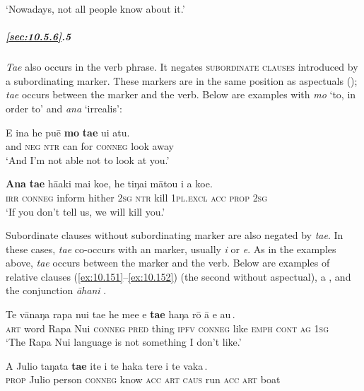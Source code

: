 \glt 
‘Nowadays, not all people know about it.’ \textstyleExampleref{[R647.206]} 
\z

\subparagraph{\ref{sec:10.5.6}.5} \textit{Ta{\ꞌ}e} also occurs in the verb phrase. It negates \textsc{subordinate clauses} introduced by a subordinating marker. These markers are in the same position as aspectuals (); \textit{\mbox{ta{\ꞌ}e}} occurs between the marker and the verb. Below are examples with \textit{mo} ‘to, in order to’ and \textit{ana} ‘irrealis’:

\ea\label{ex:10.149}
\gll {\ꞌ}E {\ꞌ}ina he puē \textbf{mo} \textbf{ta{\ꞌ}e} u{\ꞌ}i atu. \\
and \textsc{neg} \textsc{ntr} can for \textsc{conneg} look away \\

\glt 
‘And I’m not able not to look at you.’ \textstyleExampleref{[R308.023]} 
\z

\ea\label{ex:10.150}
\gll \textbf{Ana} \textbf{ta{\ꞌ}e} hā{\ꞌ}aki mai koe, he tiŋa{\ꞌ}i mātou i a koe. \\
\textsc{irr} \textsc{conneg} inform hither \textsc{2sg} \textsc{ntr} kill \textsc{1pl.excl} \textsc{acc} \textsc{prop} \textsc{2sg} \\

\glt 
‘If you don’t tell us, we will kill you.’ \textstyleExampleref{[Mtx-7-21.030]}
\z

Subordinate clauses without subordinating marker are also negated by \textit{ta{\ꞌ}e}. In these cases, \textit{ta{\ꞌ}e} co-occurs with an  marker, usually \textit{i} or \textit{e}. As in the examples above, \textit{ta{\ꞌ}e} occurs between the marker and the verb. Below are examples of relative clauses (\ref{ex:10.151}–\ref{ex:10.152}) (the second without aspectual), a  , and the conjunction \textit{{\ꞌ}āhani} .

\ea\label{ex:10.151}
\gll Te vānaŋa rapa nui ta{\ꞌ}e he me{\ꞌ}e {\ob}e \textbf{ta{\ꞌ}e} haŋa rō {\ꞌ}ā e au\,{\cb}. \\
\textsc{art} word Rapa Nui \textsc{conneg} \textsc{pred} thing {\db}\textsc{ipfv} \textsc{conneg} like \textsc{emph} \textsc{cont} \textsc{ag} \textsc{1sg} \\

\glt 
‘The Rapa Nui language is not something I don’t like.’ \textstyleExampleref{[R648.251]} 
\z

\ea\label{ex:10.152}
\gll A Julio taŋata {\ob}\textbf{ta{\ꞌ}e} {\ꞌ}ite i te haka tere i te vaka\,{\cb}. \\
\textsc{prop} Julio person {\db}\textsc{conneg} know \textsc{acc} \textsc{art} \textsc{caus} run \textsc{acc} \textsc{art} boat \\

